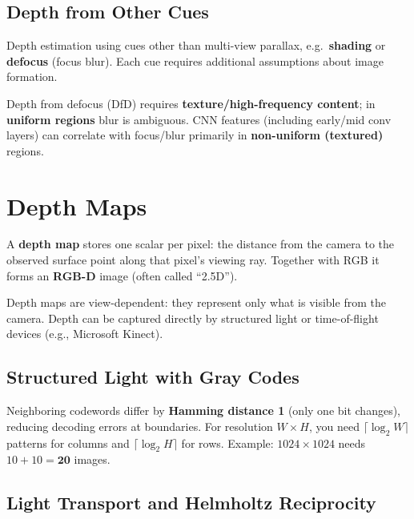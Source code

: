 \documentclass[11pt, oneside]{book}
\begin{document}
\subsection{Depth from Other Cues}

\begin{defbox}[title={Depth from X}]
Depth estimation using cues other than multi-view parallax, e.g.\ \textbf{shading} or \textbf{defocus}
(focus blur). Each cue requires additional assumptions about image formation.
\end{defbox}

Depth from defocus (DfD) requires \textbf{texture/high-frequency content}; in \textbf{uniform regions} blur is ambiguous.
CNN features (including early/mid conv layers) can correlate with focus/blur primarily in \textbf{non-uniform (textured)} regions.

\section{Depth Maps}

\begin{defbox}[title={Depth Map}]
A \textbf{depth map} stores one scalar per pixel: the distance from the camera to the observed surface point
along that pixel's viewing ray.
Together with RGB it forms an \textbf{RGB-D} image (often called ``2.5D'').
\end{defbox}

Depth maps are view-dependent: they represent only what is visible from the camera.
Depth can be captured directly by structured light or time-of-flight devices (e.g., Microsoft Kinect).

\subsection{Structured Light with Gray Codes}

\begin{notebox}[title={Gray Code Properties}]
Neighboring codewords differ by \textbf{Hamming distance 1} (only one bit changes), reducing decoding errors at boundaries.
For resolution $W\times H$, you need $\lceil\log_2 W\rceil$ patterns for columns and $\lceil\log_2 H\rceil$ for rows.
Example: $1024\times1024$ needs $10+10=\textbf{20}$ images.
\end{notebox}

\subsection{Light Transport and Helmholtz Reciprocity}
\end{document}

